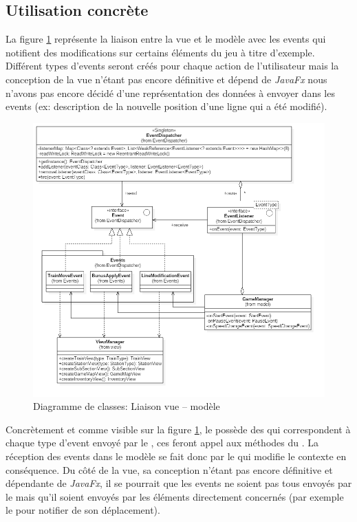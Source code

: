 \documentclass[report, backcover, french, nodocumentinfo]{upmethodology-document}
\begin{document}
			\subsection{Utilisation concrète}
				\p{}
					La figure \ref{fig:ViewModelLinkClassDiagram} représente la liaison entre la vue et le modèle avec les events qui notifient des modifications sur certains éléments du jeu à titre d'exemple. Différent types d'events seront créés pour chaque action de l'utilisateur mais la conception de la vue n'étant pas encore définitive et dépend de \textit{JavaFx} nous n'avons pas encore décidé d'une représentation des données à envoyer dans les events (ex: description de la nouvelle position d'une ligne qui a été modifié).
					\begin{figure}[h!]
						\centering
						\includegraphics[width=\textwidth]{figures/ViewModelLinkClassDiagram}
						\caption{Diagramme de classes: Liaison vue -- modèle}
						\label{fig:ViewModelLinkClassDiagram}
					\end{figure}
				\p{}
					Concrètement et comme visible sur la figure \ref{fig:ViewModelLinkClassDiagram}, le  possède des  qui correspondent à chaque type d'event envoyé par le , ces  feront appel aux méthodes  du . La réception des events dans le modèle se fait donc par le  qui modifie le contexte en conséquence. Du côté de la vue, sa conception n'étant pas encore définitive et dépendante de \textit{JavaFx}, il se pourrait que les events ne soient pas tous envoyés par le  mais qu'il soient envoyés par les éléments directement concernés (par exemple le  pour notifier de son déplacement).
\end{document}
